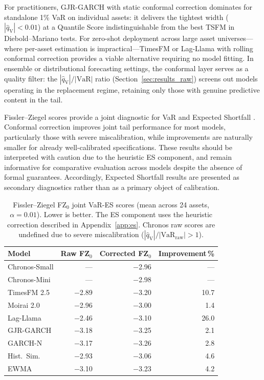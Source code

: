 \documentclass[preprint,11pt,authoryear]{elsarticle}
\newcommand{\VaR}{\mathrm{VaR}}
\newcommand{\1}{\boldsymbol{1}}
\newcommand{\qV}{\hat{q}_{\scriptscriptstyle\mathrm{V}}}
\begin{document}
	For practitioners, GJR-GARCH with static conformal correction
	dominates for standalone 1\% VaR on individual assets: it
	delivers the tightest width ($|\qV| < 0.01$) at a Quantile
	Score indistinguishable from the best TSFM in Diebold--Mariano
	tests. For zero-shot deployment across large asset
	universes---where per-asset estimation is impractical---TimesFM
	or Lag-Llama with rolling conformal correction provides a viable
	alternative requiring no model fitting. In ensemble or
	distributional forecasting settings, the conformal layer serves
	as a quality filter: the $|\qV|/|\VaR|$ ratio
	(Section~\ref{sec:results_raw}) screens out models operating in
	the replacement regime, retaining only those with genuine
	predictive content in the tail.

	Fissler--Ziegel scores provide a joint diagnostic for VaR and Expected Shortfall \citep{fissler2016higher}. Conformal correction improves joint tail performance for most models, particularly those with severe miscalibration, while improvements are naturally smaller for already well-calibrated specifications. These results should be interpreted with caution due to the heuristic ES component, and remain informative for comparative evaluation across models despite the absence of formal guarantees.
	Accordingly, Expected Shortfall results are presented as secondary diagnostics rather than as a primary object of calibration.

	\begin{table}[H]
		\centering
		\caption{Fissler--Ziegel FZ$_0$ joint VaR-ES scores (mean across 24 assets, $\alpha = 0.01$). Lower is better. The ES component uses the heuristic correction described in Appendix~\ref{app:es}. Chronos raw scores are undefined due to severe miscalibration ($|\qV|/|\mathrm{VaR}_{\mathrm{raw}}| > 1$).}
		\label{tab:fz_scores}
		\footnotesize
		\begin{tabular}{@{}lrrr@{}}
			\toprule
			Model & Raw FZ$_0$ & Corrected FZ$_0$ & Improvement\,\% \\
			\midrule
			Chronos-Small      & ---   & $-$2.96 & ---  \\
			Chronos-Mini       & ---   & $-$2.98 & ---  \\
			TimesFM 2.5        & $-$2.89 & $-$3.20 & 10.7 \\
			Moirai 2.0         & $-$2.96 & $-$3.00 &  1.4 \\
			Lag-Llama          & $-$2.46 & $-$3.10 & 26.0 \\
			GJR-GARCH          & $-$3.18 & $-$3.25 &  2.1 \\
			GARCH-N            & $-$3.17 & $-$3.26 &  2.8 \\
			Hist.\ Sim.        & $-$2.93 & $-$3.06 &  4.6 \\
			EWMA               & $-$3.10 & $-$3.23 &  4.2 \\
			\bottomrule
		\end{tabular}
	\end{table}
\end{document}
